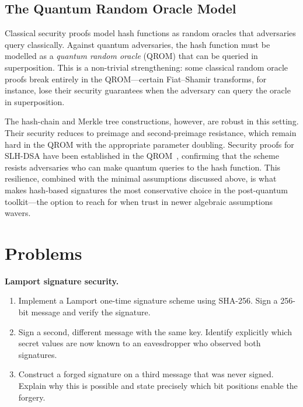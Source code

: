 \subsection{The Quantum Random Oracle Model}
\label{subsec:qrom}

Classical security proofs model hash functions as random oracles that adversaries query classically.  Against quantum adversaries, the hash function must be modelled as a \emph{quantum random oracle} (QROM) that can be queried in superposition.  This is a non-trivial strengthening: some classical random oracle proofs break entirely in the QROM---certain Fiat--Shamir transforms, for instance, lose their security guarantees when the adversary can query the oracle in superposition.

The hash-chain and Merkle tree constructions, however, are robust in this setting.  Their security reduces to preimage and second-preimage resistance, which remain hard in the QROM with the appropriate parameter doubling.  Security proofs for SLH-DSA have been established in the QROM~\cite{FIPS205}, confirming that the scheme resists adversaries who can make quantum queries to the hash function.  This resilience, combined with the minimal assumptions discussed above, is what makes hash-based signatures the most conservative choice in the post-quantum toolkit---the option to reach for when trust in newer algebraic assumptions wavers.


\section*{Problems}

\begin{prob}
\label{prob:ch10-lamport}
\textbf{Lamport signature security.}
\begin{enumerate}
\item[(a)] Implement a Lamport one-time signature scheme using SHA-256.  Sign a 256-bit message and verify the signature.
\item[(b)] Sign a second, different message with the same key.  Identify explicitly which secret values are now known to an eavesdropper who observed both signatures.
\item[(c)] Construct a forged signature on a third message that was never signed.  Explain why this is possible and state precisely which bit positions enable the forgery.
\end{enumerate}
\end{prob}

